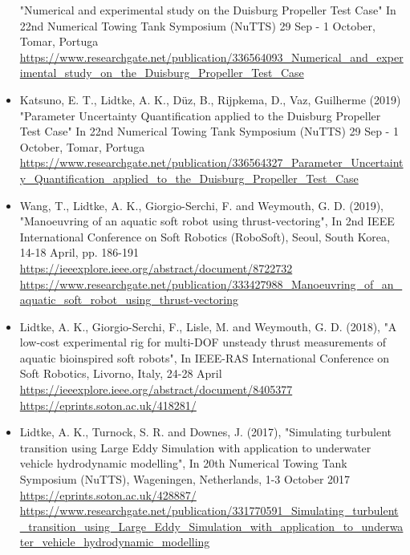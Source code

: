 \documentclass[a4paper,10pt]{article}
\begin{document}
\begin{itemize}
	"Numerical and experimental study on the Duisburg Propeller Test Case"
	In 22nd Numerical Towing Tank Symposium (NuTTS)
	29 Sep - 1 October, Tomar, Portuga
	\cite{Wielgosz2019}
	\\ \url{https://www.researchgate.net/publication/336564093_Numerical_and_experimental_study_on_the_Duisburg_Propeller_Test_Case}
%
\item Katsuno, E. T., Lidtke, A. K., D{\"u}z, B., Rijpkema, D., Vaz, Guilherme (2019)
	"Parameter Uncertainty Quantification applied to the Duisburg Propeller Test Case"
	In 22nd Numerical Towing Tank Symposium (NuTTS)
	29 Sep - 1 October, Tomar, Portuga
	\cite{Katsuno2019}
	\\ \url{https://www.researchgate.net/publication/336564327_Parameter_Uncertainty_Quantification_applied_to_the_Duisburg_Propeller_Test_Case}
%
\item Wang, T., Lidtke, A. K., Giorgio-Serchi, F. and Weymouth, G. D. (2019),
	"Manoeuvring of an aquatic soft robot using thrust-vectoring",
	In 2nd IEEE International Conference on Soft Robotics (RoboSoft),
	Seoul, South Korea, 14-18 April, pp. 186-191
	\cite{Wang2019}
	\\ \url{https://ieeexplore.ieee.org/abstract/document/8722732}
	\\ \url{https://www.researchgate.net/publication/333427988\_Manoeuvring\_of\_an\_aquatic\_soft\_robot\_using\_thrust-vectoring}
%
\item Lidtke, A. K., Giorgio-Serchi, F., Lisle, M. and Weymouth, G. D. (2018),
	"A low-cost experimental rig for multi-DOF unsteady thrust measurements of aquatic bioinspired soft robots",
	In IEEE-RAS International Conference on Soft Robotics, Livorno, Italy, 24-28 April
	\cite{Lidtke2018a}
	\\ \url{https://ieeexplore.ieee.org/abstract/document/8405377}
	\\ \url{https://eprints.soton.ac.uk/418281/}
%
\item Lidtke, A. K., Turnock, S. R. and Downes, J. (2017),
	"Simulating turbulent transition using Large Eddy Simulation with application to underwater vehicle hydrodynamic modelling",
	In 20th Numerical Towing Tank Symposium (NuTTS), Wageningen, Netherlands, 1-3 October 2017
	\cite{Lidtke2017a}
	\\ \url{https://eprints.soton.ac.uk/428887/}
	\\ \url{https://www.researchgate.net/publication/331770591\_Simulating\_turbulent\_transition\_using\_Large\_Eddy\_Simulation\_with\_application\_to\_underwater\_vehicle\_hydrodynamic\_modelling}

\end{itemize}
\end{document}

